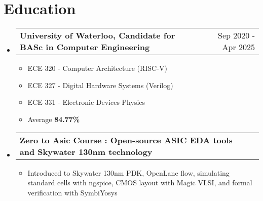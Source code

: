 \documentclass[letterpaper,11pt]{article}
\makeatletter
\newcommand{\resumeItem}[1]{
  \item\small{
    {#1 \vspace{-1pt}}
  }
}
\newcommand{\resumeEducationHeading}[2]{
  \vspace{-2pt}\item
    \begin{tabular*}{0.97\textwidth}[t]{l@{\extracolsep{\fill}}r}
      \textbf{#1} & {\small #2}
    \end{tabular*}\vspace{-5pt}
}
\newcommand{\resumeSubHeadingListStart}{\begin{itemize}[leftmargin=0pt, label={}]}
\newcommand{\resumeSubHeadingListEnd}{\end{itemize}}
\newcommand{\resumeItemListStart}{\begin{itemize}[leftmargin=0.2in, label={-}]}
\newcommand{\resumeItemListEnd}{\end{itemize}\vspace{-5pt}}
\newcommand{\resumeSectionName}[1]{\section{#1}\vspace{2pt}}
\makeatother
\begin{document}
\resumeSectionName{Education}
  \resumeSubHeadingListStart
    \resumeEducationHeading
      {University of Waterloo, Candidate for BASc in Computer Engineering
      }{Sep 2020 - Apr 2025}
      \vspace{-4pt}
    \begin{multicols}{2}
    \begin{itemize}[label={-}]
    \setlength\itemsep{-1pt}
    \item ECE 320 - Computer Architecture (RISC-V)
    \item ECE 327 - Digital Hardware Systems (Verilog)
    \end{itemize}
    \columnbreak
    \begin{itemize}[label={-}]
    \setlength\itemsep{-1pt}
    \item ECE 331 - Electronic Devices Physics 
    \item Average \textbf{84.77\%}
    \end{itemize}
    \end{multicols}
    \vspace{-13pt}

    \resumeEducationHeading
      {Zero to Asic Course : Open-source ASIC EDA tools and Skywater 130nm technology
      }{}
    \resumeItemListStart
        \resumeItem{Introduced to Skywater 130nm PDK, OpenLane flow, simulating standard cells with ngspice, CMOS layout with Magic VLSI, and formal verification with SymbiYosys}
    \resumeItemListEnd
\resumeSubHeadingListEnd
\end{document}
